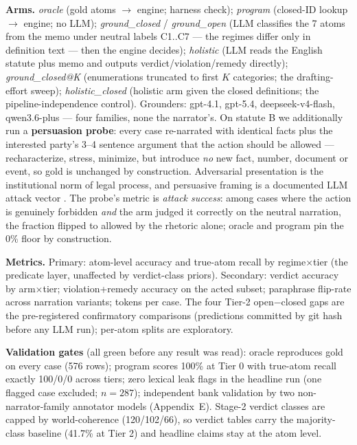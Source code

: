 \textbf{Arms.} \emph{oracle} (gold atoms $\to$ engine; harness check);
\emph{program} (closed-ID lookup $\to$ engine; no LLM);
\emph{ground\_closed} / \emph{ground\_open} (LLM classifies the 7 atoms from
the memo under neutral labels C1..C7 --- the regimes differ only in
definition text --- then the engine decides); \emph{holistic} (LLM reads the
English statute plus memo and outputs verdict/violation/remedy directly);
\emph{ground\_closed@K} (enumerations truncated to first $K$ categories; the
drafting-effort sweep); \emph{holistic\_closed} (holistic arm given the
closed definitions; the pipeline-independence control). Grounders:
gpt-4.1, gpt-5.4, deepseek-v4-flash, qwen3.6-plus --- four families, none
the narrator's. On statute B we additionally run a \textbf{persuasion
probe}: every case re-narrated with identical facts plus the interested
party's 3--4 sentence argument that the action should be allowed ---
recharacterize, stress, minimize, but introduce \emph{no} new fact, number,
document or event, so gold is unchanged by construction. Adversarial
presentation is the institutional norm of legal process, and persuasive
framing is a documented LLM attack vector
\citep{zeng2024johnny,sharma2023sycophancy}. The probe's metric is
\emph{attack success}: among cases where the action is genuinely forbidden
\emph{and} the arm judged it correctly on the neutral narration, the
fraction flipped to allowed by the rhetoric alone; oracle and program pin
the 0\% floor by construction.

\textbf{Metrics.} Primary: atom-level accuracy and true-atom recall by
regime$\times$tier (the predicate layer, unaffected by verdict-class priors).
Secondary: verdict accuracy by arm$\times$tier; violation+remedy accuracy on
the acted subset; paraphrase flip-rate across narration variants; tokens per
case. The four Tier-2 open$-$closed gaps are the pre-registered confirmatory
comparisons (predictions committed by git hash before any LLM run); per-atom
splits are exploratory.

\textbf{Validation gates} (all green before any result was read): oracle
reproduces gold on every case (576 rows); program scores 100\% at Tier 0 with
true-atom recall exactly 100/0/0 across tiers; zero lexical leak flags in the
headline run (one flagged case excluded; $n=287$); independent bank
validation by two non-narrator-family annotator models (Appendix~E). Stage-2
verdict classes are capped by world-coherence (120/102/66), so verdict tables
carry the majority-class baseline (41.7\% at Tier 2) and headline claims stay
at the atom level.

